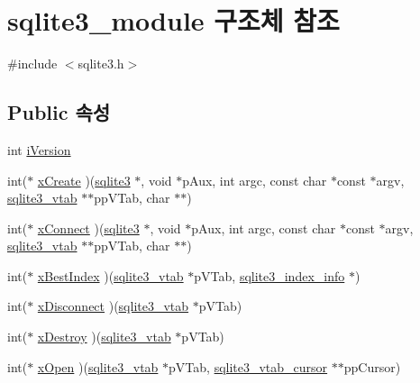 \hypertarget{structsqlite3__module}{}\section{sqlite3\+\_\+module 구조체 참조}
\label{structsqlite3__module}


{\ttfamily \#include $<$sqlite3.\+h$>$}

\subsection*{Public 속성}
\begin{DoxyCompactItemize}
\item 
int \hyperlink{structsqlite3__module_a42b11d080dc205aea43581b18f925afe}{i\+Version}
\item 
int($\ast$ \hyperlink{structsqlite3__module_a5934e38da1222cac999d01d372af293e}{x\+Create} )(\hyperlink{sqlite3_8h_a0ef6f2646262c8a9b24368d8ac140f69}{sqlite3} $\ast$, void $\ast$p\+Aux, int argc, const char $\ast$const $\ast$argv, \hyperlink{structsqlite3__vtab}{sqlite3\+\_\+vtab} $\ast$$\ast$pp\+V\+Tab, char $\ast$$\ast$)
\item 
int($\ast$ \hyperlink{structsqlite3__module_a457fe622b5334195640e3e835c9923a8}{x\+Connect} )(\hyperlink{sqlite3_8h_a0ef6f2646262c8a9b24368d8ac140f69}{sqlite3} $\ast$, void $\ast$p\+Aux, int argc, const char $\ast$const $\ast$argv, \hyperlink{structsqlite3__vtab}{sqlite3\+\_\+vtab} $\ast$$\ast$pp\+V\+Tab, char $\ast$$\ast$)
\item 
int($\ast$ \hyperlink{structsqlite3__module_aad92b2cd56253baaeac656d7693ce4af}{x\+Best\+Index} )(\hyperlink{structsqlite3__vtab}{sqlite3\+\_\+vtab} $\ast$p\+V\+Tab, \hyperlink{structsqlite3__index__info}{sqlite3\+\_\+index\+\_\+info} $\ast$)
\item 
int($\ast$ \hyperlink{structsqlite3__module_a0107afd3c350db14098edbaae04342df}{x\+Disconnect} )(\hyperlink{structsqlite3__vtab}{sqlite3\+\_\+vtab} $\ast$p\+V\+Tab)
\item 
int($\ast$ \hyperlink{structsqlite3__module_a0ec3414a65bb24f400e8cfd820751412}{x\+Destroy} )(\hyperlink{structsqlite3__vtab}{sqlite3\+\_\+vtab} $\ast$p\+V\+Tab)
\item 
int($\ast$ \hyperlink{structsqlite3__module_a3f1e18ef5e5bd4ddbd9500c7cd951f34}{x\+Open} )(\hyperlink{structsqlite3__vtab}{sqlite3\+\_\+vtab} $\ast$p\+V\+Tab, \hyperlink{structsqlite3__vtab__cursor}{sqlite3\+\_\+vtab\+\_\+cursor} $\ast$$\ast$pp\+Cursor)
\item 
$$
\end{DoxyCompactItemize}
